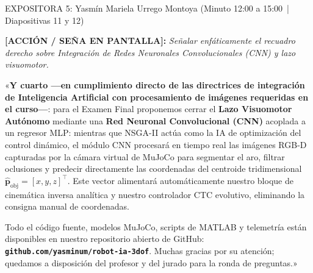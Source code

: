 \documentclass[11pt,a4paper]{article}
\newcommand{\accion}[1]{%
  \par\smallskip\noindent%
  {\color{uniGranate}\textbf{[ACCIÓN / SEÑA EN PANTALLA]:}} {\itshape\color{uniAzul!90!black} #1}\par\smallskip%
}
\newcommand{\speech}[1]{%
  \noindent{\color{verdeOk!85!black}\textbf{[SPEECH]:}} «#1»\par\medskip%
}
\begin{document}
\begin{cajaexpositor}[morado]{EXPOSITORA 5: Yasmín Mariela Urrego Montoya (Minuto 12:00 a 15:00 \,|\, Diapositivas 11 y 12)}
\accion{Señalar enfáticamente el recuadro derecho sobre Integración de Redes Neuronales Convolucionales (CNN) y lazo visuomotor.}
\speech{\textbf{Y cuarto —en cumplimiento directo de las directrices de integración de Inteligencia Artificial con procesamiento de imágenes requeridas en el curso—}:
para el Examen Final proponemos cerrar el \textbf{Lazo Visuomotor Autónomo} mediante una \textbf{Red Neuronal Convolucional (CNN)} acoplada a un regresor MLP: mientras que NSGA-II actúa como la IA de optimización del control dinámico, el módulo CNN procesará en tiempo real las imágenes RGB-D capturadas por la cámara virtual de MuJoCo para segmentar el aro, filtrar oclusiones y predecir directamente las coordenadas del centroide tridimensional $\hat{\bm{p}}_{\text{obj}} = [x, y, z]^\top$. Este vector alimentará automáticamente nuestro bloque de cinemática inversa analítica y nuestro controlador CTC evolutivo, eliminando la consigna manual de coordenadas.

Todo el código fuente, modelos MuJoCo, scripts de MATLAB y telemetría están disponibles en nuestro repositorio abierto de GitHub: \textbf{\texttt{github.com/yasminum/robot-ia-3dof}}. Muchas gracias por su atención; quedamos a disposición del profesor y del jurado para la ronda de preguntas.}
\end{cajaexpositor}
\end{document}
